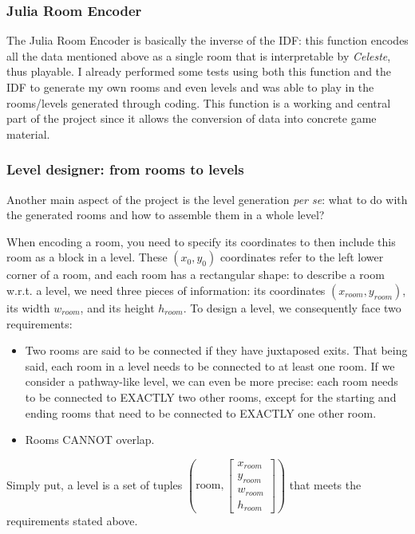 \documentclass{article}
\newcommand{\Celnosp}{\textit{Celeste}}
\begin{document}
\subsubsection{Julia Room Encoder}
The Julia Room Encoder is basically the inverse of the IDF: this function encodes all the data mentioned above as a single room that is interpretable by \Celnosp, thus playable. I already performed some tests using both this function and the IDF to generate my own rooms and even levels and was able to play in the rooms/levels generated through coding. This function is a working and central part of the project since it allows the conversion of data into concrete game material.

\subsubsection{Level designer: from rooms to levels \label{ld}}

Another main aspect of the project is the level generation \textit{per se}: what to do with the generated rooms and how to assemble them in a whole level?

\noindent When encoding a room, you need to specify its coordinates to then include this room as a block in a level. These $(x_0, y_0)$ coordinates refer to the left lower corner of a room, and each room has a rectangular shape: to describe a room w.r.t. a level, we need three pieces of information: its coordinates $(x_{room}, y_{room})$, its width $w_{room}$, and its height $h_{room}$. To design a level, we consequently face two requirements:
\begin{itemize}
    \item Two rooms are said to be connected if they have juxtaposed exits. That being said, each room in a level needs to be connected to at least one room. If we consider a pathway-like level, we can even be more precise: each room needs to be connected to EXACTLY two other rooms, except for the starting and ending rooms that need to be connected to EXACTLY one other room.
    \item Rooms CANNOT overlap.
\end{itemize}

Simply put, a level is a set of tuples $\left(\text{room}, \begin{bmatrix}
x_{room}\\ 
y_{room}\\ 
w_{room}\\ 
h_{room}
\end{bmatrix}\right)$ that meets the requirements stated above.
\end{document}
